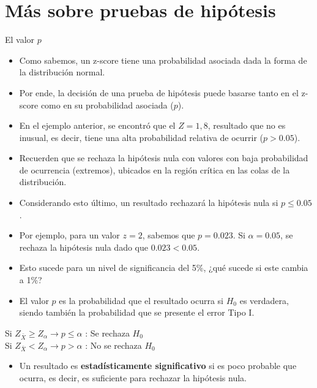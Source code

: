 \documentclass{beamer}
\begin{document}
\section{Más sobre pruebas de hipótesis}
\begin{frame}{El valor $p$}
\begin{itemize}
\justifying
\item Como sabemos, un z-score tiene una probabilidad asociada dada la forma de la distribución normal.
\item Por ende, la decisión de una prueba de hipótesis puede basarse tanto en el z-score como en su probabilidad asociada ($p$).
\item En el ejemplo anterior, se encontró que el $Z=1,8$, resultado que no es inusual, es decir, tiene una alta probabilidad relativa de ocurrir ($p>0.05$).
\item Recuerden que se rechaza la hipótesis nula con valores con baja probabilidad de ocurrencia (extremos), ubicados en la región crítica en las colas de la distribución.
\item Considerando esto último, un resultado rechazará la hipótesis nula si $p\leq0.05$.
\end{itemize}
\end{frame}

\begin{frame}
\begin{itemize}
\justifying
\item Por ejemplo, para un valor $z=2$, sabemos que $p=0.023$. Si $\alpha=0.05$, se rechaza la hipótesis nula dado que $0.023<0.05$.
\item Esto sucede para un nivel de significancia del 5\%, ¿qué sucede si este cambia a 1\%?
\item El valor $p$ es la probabilidad que el resultado ocurra si $H_0$ es verdadera, siendo también la probabilidad que se presente el error Tipo I.
\end{itemize}

\begin{center}
Si $Z_{\bar{X}} \geq Z_{\alpha} \rightarrow p \leq \alpha$ : Se rechaza $H_0$ \\
Si $Z_{\bar{X}} < Z_{\alpha} \rightarrow p > \alpha$ : No se rechaza $H_0$
\end{center}
\begin{itemize}
	\item Un resultado es {\bf estadísticamente significativo} si es poco probable que ocurra, es decir, es suficiente para rechazar la hipótesis nula.
\end{itemize}
\end{frame}
\end{document}
